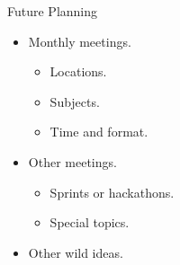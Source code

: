 \documentclass[dvips,xcolor=pst]{beamer}
\begin{document}
\begin{frame}{
%
Future Planning
%
}
\begin{itemize} \large
  \item Monthly meetings.
  \begin{itemize} \large
    \item Locations.
    \item Subjects.
    \item Time and format.
  \end{itemize}
  \item Other meetings.
  \begin{itemize} \large
    \item Sprints or hackathons.
    \item Special topics.
  \end{itemize}
  \item Other wild ideas.
\end{itemize}
\end{frame}
\end{document}
